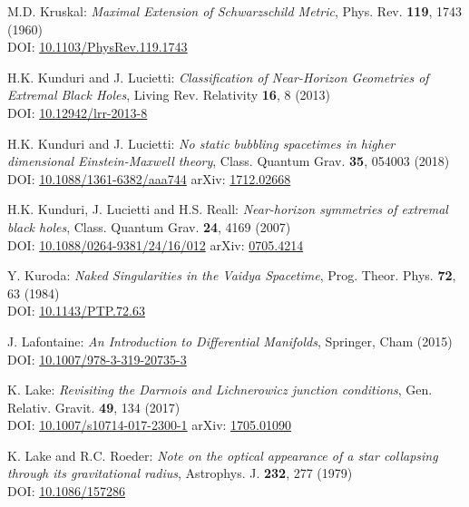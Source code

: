 \begin{thebibliography}{123}
M.D. Kruskal:
{\em Maximal Extension of Schwarzschild Metric},
Phys. Rev. {\bf 119}, 1743 (1960)\\
DOI: \href{https://doi.org/10.1103/PhysRev.119.1743}{10.1103/PhysRev.119.1743}

H.K. Kunduri and J. Lucietti:
{\em Classification of Near-Horizon Geometries of Extremal Black Holes},
Living Rev. Relativity {\bf 16}, 8 (2013)\\
DOI: \href{https://doi.org/10.12942/lrr-2013-8}{10.12942/lrr-2013-8}

H.K. Kunduri and J. Lucietti:
{\em No static bubbling spacetimes in higher dimensional Einstein-Maxwell theory},
Class. Quantum Grav. {\bf 35}, 054003 (2018)\\
DOI: \href{https://doi.org/10.1088/1361-6382/aaa744}{10.1088/1361-6382/aaa744}\hfill
arXiv: \href{https://arxiv.org/abs/1712.02668}{1712.02668}

H.K. Kunduri, J. Lucietti and H.S. Reall:
{\em Near-horizon symmetries of extremal black holes},
Class. Quantum Grav. {\bf 24}, 4169 (2007)\\
DOI: \href{https://doi.org/10.1088/0264-9381/24/16/012}{10.1088/0264-9381/24/16/012}\hfill
arXiv: \href{https://arxiv.org/abs/0705.4214}{0705.4214}

Y. Kuroda:
{\em Naked Singularities in the Vaidya Spacetime},
Prog. Theor. Phys. {\bf 72}, 63 (1984)\\
DOI: \href{https://doi.org/10.1143/PTP.72.63}{10.1143/PTP.72.63}

J. Lafontaine: {\em An Introduction to Differential Manifolds},
Springer, Cham (2015)\\
DOI: \href{https://doi.org/10.1007/978-3-319-20735-3}{10.1007/978-3-319-20735-3}

K. Lake:
{\em Revisiting the Darmois and Lichnerowicz junction conditions},
Gen. Relativ. Gravit. {\bf 49}, 134 (2017)\\
DOI: \href{https://doi.org/10.1007/s10714-017-2300-1}{10.1007/s10714-017-2300-1}\hfill
arXiv: \href{https://arxiv.org/abs/1705.01090}{1705.01090}

K. Lake and R.C. Roeder:
{\em Note on the optical appearance of a star collapsing through its gravitational radius},
Astrophys. J. {\bf 232}, 277 (1979)\\
DOI: \href{https://doi.org/10.1086/157286}{10.1086/157286}


\end{thebibliography}
